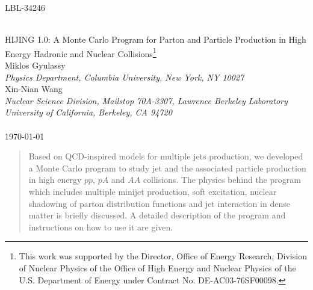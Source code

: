 \textwidth=6.5in
\textheight=9in
\hoffset=-0.5in
\voffset=-1in
\newcommand{\doe}{This work was supported by the Director, Office of Energy 
                  Research, Division of Nuclear Physics of the Office of High 
                  Energy and Nuclear Physics of the U.S. Department of Energy 
                  under Contract No. DE-AC03-76SF00098.}



\begin{titlepage}

\begin{flushright}
     {\large LBL-34246}
  \end{flushright}
\baselineskip
\renewcommand{\thefootnote}{\fnsymbol{footnote}}
\setcounter{footnote}{0}
\begin{center}
\baselineskip=24pt
\mbox{}\\[5ex]
{\Large HIJING 1.0: A Monte Carlo Program for Parton and Particle Production
in High Energy Hadronic and Nuclear Collisions{\footnote{\doe}}}\\[5ex]
\baselineskip=18pt
{\large Miklos Gyulassy}\\[2ex]
{\em Physics Department, Columbia University, New York, NY 10027}\\[2ex]
{\large Xin-Nian Wang}\\[2ex]
{\em Nuclear Science Division, Mailstop 70A-3307, 
        Lawrence Berkeley Laboratory}\\
{\em University of California, Berkeley, CA 94720}\\
        \mbox{}\\[3ex]
\today\\[5ex]
\end{center}

\begin{abstract}
\normalsize
\baselineskip=24pt
        Based on QCD-inspired models for multiple jets production, we 
developed a Monte Carlo program to study jet and the associated particle 
production in high energy $pp$, $pA$ and $AA$ collisions. The physics behind
the program which includes multiple minijet production, soft excitation,
nuclear shadowing of parton distribution functions and jet interaction 
in dense matter is briefly discussed. A detailed description of the
program and instructions on how to use it are given.
\end{abstract}

\end{titlepage}

